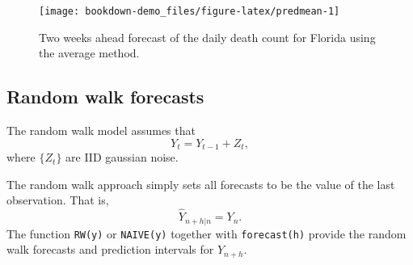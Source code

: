 \documentclass[]{book}
\newenvironment{Shaded}{\begin{snugshade}}{\end{snugshade}}
\newcommand{\KeywordTok}[1]{\textcolor[rgb]{0.13,0.29,0.53}{\textbf{#1}}}
\newcommand{\DataTypeTok}[1]{\textcolor[rgb]{0.13,0.29,0.53}{#1}}
\newcommand{\DecValTok}[1]{\textcolor[rgb]{0.00,0.00,0.81}{#1}}
\newcommand{\StringTok}[1]{\textcolor[rgb]{0.31,0.60,0.02}{#1}}
\newcommand{\CommentTok}[1]{\textcolor[rgb]{0.56,0.35,0.01}{\textit{#1}}}
\newcommand{\OperatorTok}[1]{\textcolor[rgb]{0.81,0.36,0.00}{\textbf{#1}}}
\newcommand{\NormalTok}[1]{#1}
\begin{document}
\begin{Shaded}
\end{Shaded}

\begin{figure}

{\centering \texttt{[image: bookdown-demo\_files/figure-latex/predmean-1]} 

}

\caption{Two weeks ahead forecast of the daily death count for Florida using the average method.}\label{fig:predmean}
\end{figure}

\subsection{Random walk forecasts}\label{random-walk-forecasts}

The random walk model assumes that \[
Y_t=Y_{t-1}+Z_t,
\] where \(\{Z_t\}\) are IID gaussian noise.

The random walk approach simply sets all forecasts to be the value of
the last observation. That is, \[
\hat{Y}_{n+h|n}=Y_n.
\] The function \texttt{RW(y)} or \texttt{NAIVE(y)} together with
\texttt{forecast(h)} provide the random walk forecasts and prediction
intervals for \(Y_{n+h}\).

\begin{Shaded}
\end{Shaded}
\end{document}
